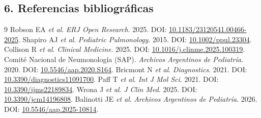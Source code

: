 \documentclass[11pt,letterpaper]{article}
\begin{document}
\subsection*{6. Referencias bibliográficas}

\begin{thebibliography}{9}
 Robson EA \textit{et al}. \textit{ERJ Open Research}. 2025. DOI: \href{https://doi.org/10.1183/23120541.00466-2025}{10.1183/23120541.00466-2025}.
 Shapiro AJ \textit{et al}. \textit{Pediatric Pulmonology}. 2015. DOI: \href{https://doi.org/10.1002/ppul.23304}{10.1002/ppul.23304}.
 Collison R \textit{et al}. \textit{Clinical Medicine}. 2025. DOI: \href{https://doi.org/10.1016/j.clinme.2025.100319}{10.1016/j.clinme.2025.100319}.
 Comité Nacional de Neumonología (SAP). \textit{Archivos Argentinos de Pediatría}. 2020. DOI: \href{https://doi.org/10.5546/aap.2020.S164}{10.5546/aap.2020.S164}.
 Bricmont N \textit{et al}. \textit{Diagnostics}. 2021. DOI: \href{https://doi.org/10.3390/diagnostics11091700}{10.3390/diagnostics11091700}.
 Paff T \textit{et al}. \textit{Int J Mol Sci}. 2021. DOI: \href{https://doi.org/10.3390/ijms22189834}{10.3390/ijms22189834}.
 Wrona J \textit{et al}. \textit{J Clin Med}. 2025. DOI: \href{https://doi.org/10.3390/jcm14196808}{10.3390/jcm14196808}.
 Balinotti JE \textit{et al}. \textit{Archivos Argentinos de Pediatría}. 2026. DOI: \href{https://doi.org/10.5546/aap.2025-10814}{10.5546/aap.2025-10814}.
\end{thebibliography}
\end{document}
